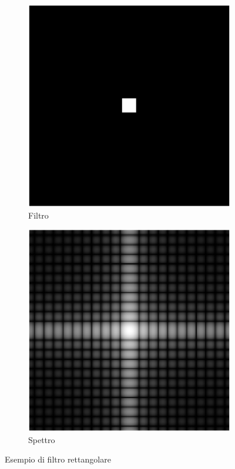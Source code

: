 \documentclass[../main.tex]{subfiles}
\begin{document}
	\begin{figure}[ht]
		\centering
		\begin{subfigure}{0.4\linewidth}
			\centering
			\includegraphics[keepaspectratio, width=\linewidth]{images/box_spatial.png}
			\caption{Filtro}
		\end{subfigure}
		\hspace{20pt}
		\begin{subfigure}{0.4\linewidth}
			\centering
			\includegraphics[keepaspectratio, width=\linewidth]{images/box_spectrum.png}
			\caption{Spettro}
		\end{subfigure}
		\caption{Esempio di filtro rettangolare}
	\end{figure}
	
\end{document}
